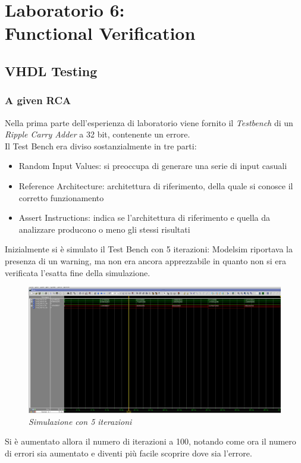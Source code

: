 \chapter{Laboratorio 6: \\Functional Verification}
\section{VHDL Testing}
\subsection{A given RCA}
Nella prima parte dell'esperienza di laboratorio viene fornito il \textit{Testbench} di un \textit{Ripple Carry Adder} a 32 bit, contenente un errore.\\
Il Test Bench era diviso sostanzialmente in tre parti:
\begin{itemize}
	\item{Random Input Values}: si preoccupa di generare una serie di input casuali
	\item{Reference Architecture}: architettura di riferimento, della quale si conosce il corretto funzionamento
	\item{Assert Instructions}: indica se l'architettura di riferimento e quella da analizzare producono o meno gli stessi risultati
\end{itemize}
Inizialmente si è simulato il Test Bench con 5 iterazioni: Modelsim riportava la presenza di un warning, ma non era ancora apprezzabile in quanto non si era verificata l'esatta fine della simulazione.\\
\begin{figure}[!htb]
	\centering
	\includegraphics[scale=0.2]{immagini/5_1_1}
	\caption{\textit{Simulazione con 5 iterazioni}}
	\label{5_1_1}
\end{figure}
\newpage
\noindent Si è aumentato allora il numero di iterazioni a 100, notando come ora il numero di errori sia aumentato e diventi più facile scoprire dove sia l'errore.
